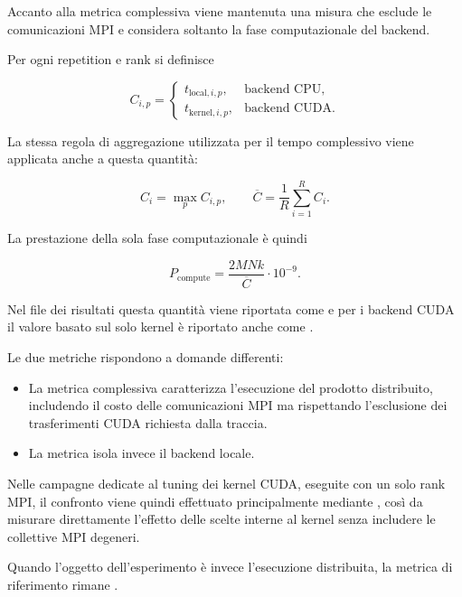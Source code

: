 Accanto alla metrica complessiva viene mantenuta una misura che esclude le
comunicazioni MPI e considera soltanto la fase computazionale del backend.

Per ogni repetition e rank si definisce

\begin{equation}
C_{i,p}
=
\begin{cases}
t_{\mathrm{local},i,p},
& \text{backend CPU}, \\[4pt]
t_{\mathrm{kernel},i,p},
& \text{backend CUDA}.
\end{cases}
\end{equation}

La stessa regola di aggregazione utilizzata per il tempo complessivo viene
applicata anche a questa quantità:

\[
C_i=\max_p C_{i,p},
\qquad
\overline{C}
=
\frac{1}{R}\sum_{i=1}^{R}C_i.
\]

La prestazione della sola fase computazionale è quindi

\begin{equation}
P_{\mathrm{compute}}
=
\frac{2MNk}{\overline{C}}\cdot10^{-9}.
\end{equation}

Nel file dei risultati questa quantità viene riportata come
 e per i backend CUDA il valore basato sul solo kernel
è riportato anche come .

Le due metriche rispondono a domande differenti:

\begin{itemize}
      \item La metrica complessiva  caratterizza l'esecuzione del prodotto
      distribuito, includendo il costo delle comunicazioni MPI ma rispettando
      l'esclusione dei trasferimenti CUDA richiesta dalla traccia.
      \item La metrica  isola invece il backend locale.
\end{itemize}

Nelle
campagne dedicate al tuning dei kernel CUDA, eseguite con un solo rank MPI,
il confronto viene quindi effettuato principalmente mediante
, così da misurare direttamente l'effetto delle scelte
interne al kernel senza includere le collettive MPI degeneri.

Quando l'oggetto dell'esperimento è invece l'esecuzione distribuita, la
metrica di riferimento rimane .


